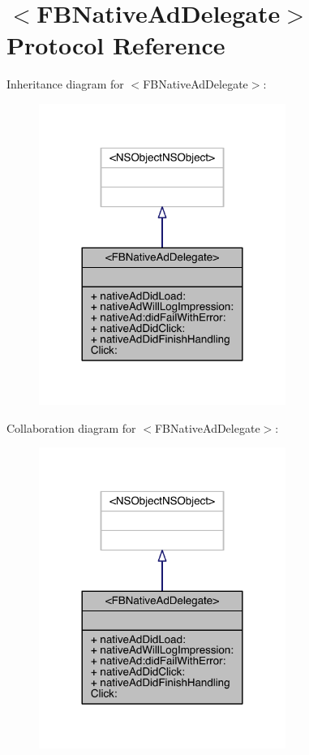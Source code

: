 \hypertarget{protocol_f_b_native_ad_delegate-p}{\section{$<$F\-B\-Native\-Ad\-Delegate$>$ Protocol Reference}
\label{protocol_f_b_native_ad_delegate-p}
}


Inheritance diagram for $<$F\-B\-Native\-Ad\-Delegate$>$\-:
\nopagebreak
\begin{figure}[H]
\begin{center}
\leavevmode
\includegraphics[width=228pt]{protocol_f_b_native_ad_delegate-p__inherit__graph}
\end{center}
\end{figure}


Collaboration diagram for $<$F\-B\-Native\-Ad\-Delegate$>$\-:
\nopagebreak
\begin{figure}[H]
\begin{center}
\leavevmode
\includegraphics[width=228pt]{protocol_f_b_native_ad_delegate-p__coll__graph}
\end{center}
\end{figure}
